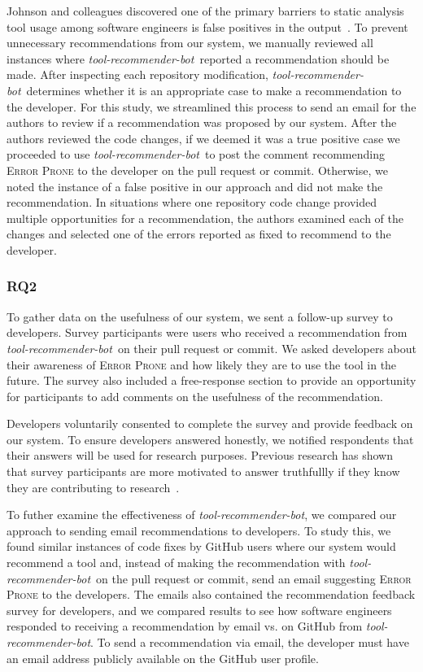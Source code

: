 \documentclass[sigconf,review,anonymous]{acmart}
\newcommand{\tool}{\textsl{tool-recommender-bot}}
\begin{document}
Johnson and colleagues discovered one of the primary barriers to static analysis tool usage among software engineers is false positives in the output~\cite{Johnson2013Why}. To prevent unnecessary recommendations from our system, we manually reviewed all instances where \tool~reported a recommendation should be made. After inspecting each repository modification, \tool~determines whether it is an appropriate case to make a recommendation to the developer. For this study, we streamlined this process to send an email for the authors to review if a recommendation was proposed by our system. After the authors reviewed the code changes, if we deemed it was a true positive case we proceeded to use \tool~to post the comment recommending \textsc{Error Prone} to the developer on the pull request or commit. Otherwise, we noted the instance of a false positive in our approach and did not make the recommendation. In situations where one repository code change provided multiple opportunities for a recommendation, the authors examined each of the changes and selected one of the errors reported as fixed to recommend to the developer.

\subsubsection{RQ2}

To gather data on the usefulness of our system, we sent a follow-up survey to developers. Survey participants were users who received a recommendation from \tool~on their pull request or commit. We asked developers about their awareness of \textsc{Error Prone} and how likely they are to use the tool in the future. The survey also included a free-response section to provide an opportunity for participants to add comments on the usefulness of the recommendation.

Developers voluntarily consented to complete the survey and provide feedback on our system. To ensure developers answered honestly, we notified respondents that their answers will be used for research purposes. Previous research has shown that survey participants are more motivated to answer truthfullly if they know they are contributing to research~\cite{Krosnick1991Research}. 

To futher examine the effectiveness of \tool, we compared our approach to sending email recommendations to developers. To study this, we found similar instances of code fixes by GitHub users where our system would recommend a tool and, instead of making the recommendation with \tool~on the pull request or commit, send an email suggesting \textsc{Error Prone} to the developers. The emails also contained the recommendation feedback survey for developers, and we compared results to see how software engineers responded to receiving a recommendation by email vs. on GitHub from \tool. To send a recommendation via email, the developer must have an email address publicly available on the GitHub user profile. 
\end{document}
